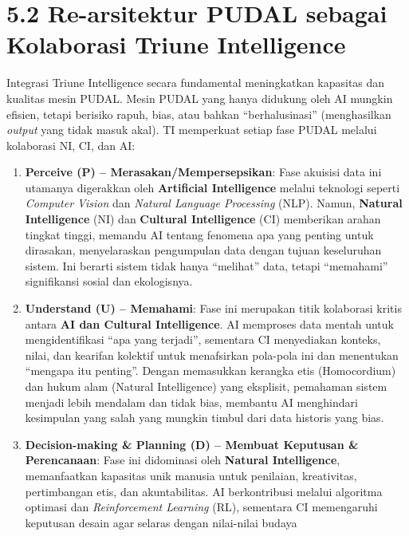 \documentclass[
  letterpaper,
  DIV=11,
  numbers=noendperiod]{scrreprt}
\begin{document}
\section{\texorpdfstring{\textbf{5.2 Re-arsitektur PUDAL sebagai
Kolaborasi Triune
Intelligence}}{5.2 Re-arsitektur PUDAL sebagai Kolaborasi Triune Intelligence}}\label{re-arsitektur-pudal-sebagai-kolaborasi-triune-intelligence}

Integrasi Triune Intelligence secara fundamental meningkatkan kapasitas
dan kualitas mesin PUDAL. Mesin PUDAL yang hanya didukung oleh AI
mungkin efisien, tetapi berisiko rapuh, bias, atau bahkan
``berhalusinasi'' (menghasilkan \emph{output} yang tidak masuk akal). TI
memperkuat setiap fase PUDAL melalui kolaborasi NI, CI, dan AI:

\begin{enumerate}
\def\labelenumi{\arabic{enumi}.}
\item
  \textbf{Perceive (P) -- Merasakan/Mempersepsikan}: Fase akuisisi data
  ini utamanya digerakkan oleh \textbf{Artificial Intelligence} melalui
  teknologi seperti \emph{Computer Vision} dan \emph{Natural Language
  Processing} (NLP). Namun, \textbf{Natural Intelligence} (NI) dan
  \textbf{Cultural Intelligence} (CI) memberikan arahan tingkat tinggi,
  memandu AI tentang fenomena apa yang penting untuk dirasakan,
  menyelaraskan pengumpulan data dengan tujuan keseluruhan sistem. Ini
  berarti sistem tidak hanya ``melihat'' data, tetapi ``memahami''
  signifikansi sosial dan ekologisnya.
\item
  \textbf{Understand (U) -- Memahami}: Fase ini merupakan titik
  kolaborasi kritis antara \textbf{AI dan Cultural Intelligence}. AI
  memproses data mentah untuk mengidentifikasi ``apa yang terjadi'',
  sementara CI menyediakan konteks, nilai, dan kearifan kolektif untuk
  menafsirkan pola-pola ini dan menentukan ``mengapa itu penting''.
  Dengan memasukkan kerangka etis (Homocordium) dan hukum alam (Natural
  Intelligence) yang eksplisit, pemahaman sistem menjadi lebih mendalam
  dan tidak bias, membantu AI menghindari kesimpulan yang salah yang
  mungkin timbul dari data historis yang bias.
\item
  \textbf{Decision-making \& Planning (D) -- Membuat Keputusan \&
  Perencanaan}: Fase ini didominasi oleh \textbf{Natural Intelligence},
  memanfaatkan kapasitas unik manusia untuk penilaian, kreativitas,
  pertimbangan etis, dan akuntabilitas. AI berkontribusi melalui
  algoritma optimasi dan \emph{Reinforcement Learning} (RL), sementara
  CI memengaruhi keputusan desain agar selaras dengan nilai-nilai budaya

\end{enumerate}
\end{document}
